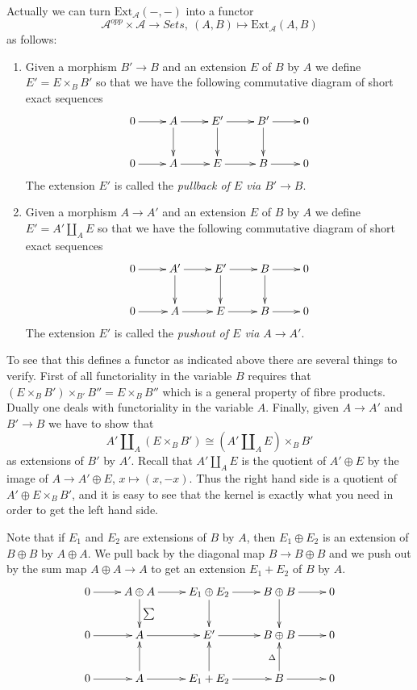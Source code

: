 \medskip\noindent
Actually we can turn $\text{Ext}_\mathcal{A}(-, -)$ into a
functor
$$
\mathcal{A}^{opp} \times \mathcal{A} \longrightarrow \textit{Sets}, \ 
(A, B) \longmapsto \text{Ext}_\mathcal{A}(A, B)
$$
as follows:
\begin{enumerate}
\item Given a morphism $B' \to B$ and an extension
$E$ of $B$ by $A$ we define $E' = E \times_B B'$
so that we have the following commutative diagram
of short exact sequences
$$
\xymatrix{
0 \ar[r] & A \ar[r] \ar[d] & E' \ar[r] \ar[d] & B' \ar[r] \ar[d] & 0 \\
0 \ar[r] & A \ar[r] & E \ar[r] & B \ar[r] & 0
}
$$
The extension $E'$ is called the {\it pullback of $E$ via
$B' \to B$}.
\item Given a morphism $A \to A'$ and an extension
$E$ of $B$ by $A$ we define $E' = A' \coprod_A E$
so that we have the following commutative diagram
of short exact sequences
$$
\xymatrix{
0 \ar[r] & A' \ar[r] \ar[d] & E' \ar[r] \ar[d] & B \ar[r] \ar[d] & 0 \\
0 \ar[r] & A \ar[r] & E \ar[r] & B \ar[r] & 0
}
$$
The extension $E'$ is called the {\it pushout of $E$ via
$A \to A'$}.
\end{enumerate}
To see that this defines a functor as indicated above
there are several things to verify. First of all
functoriality in the variable $B$ requires that
$(E \times_B B') \times_{B'} B'' = E \times_B B''$
which is a general property of fibre products.
Dually one deals with functoriality in the
variable $A$. Finally, given $A \to A'$ and
$B' \to B$ we have to show that
$$
A' \coprod\nolimits_A (E \times_B B')
\cong
(A' \coprod\nolimits_A E)\times_B B'
$$
as extensions of $B'$ by $A'$. Recall that $A' \coprod_A E$
is the quotient of $A' \oplus E$ by the image of
$A \to A' \oplus E$, $x \mapsto (x, -x)$.
Thus the right hand side is a quotient of
$A' \oplus E \times_B B'$, and it is easy to see that
the kernel is exactly what you need in order to
get the left hand side.

\medskip\noindent
Note that if $E_1$ and $E_2$ are extensions of
$B$ by $A$, then $E_1\oplus E_2$ is an extension
of $B \oplus B$ by $A\oplus A$. We pull back by
the diagonal map $B \to B \oplus B$ and we push
out by the sum map $A \oplus A \to A$ to get
an extension $E_1 + E_2$ of $B$ by $A$.
$$
\xymatrix{
0 \ar[r] &
A \oplus A \ar[r] \ar[d]^{\sum} &
E_1 \oplus E_2 \ar[r] \ar[d] &
B \oplus B \ar[r] \ar[d] &
0 \\
0 \ar[r] &
A \ar[r] &
E' \ar[r] &
B \oplus B \ar[r] &
0\\
0 \ar[r] &
A \ar[r] \ar[u] &
E_1 + E_2 \ar[r] \ar[u] &
B \ar[r] \ar[u]^{\Delta} &
0
}
$$


